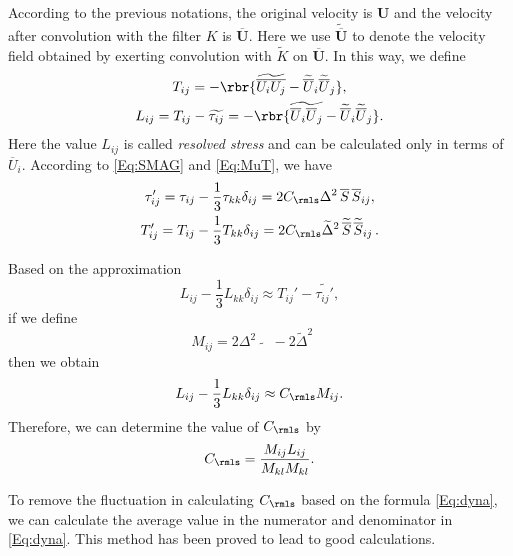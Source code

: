 \documentclass[english, nochinese]{pkupaper}
\begin{document}
According to the previous notations, the original velocity is $\mathbf{U}$ and the velocity after convolution with the filter $K$ is $\overline{\mathbf{U}}$. Here we use $\widetilde{\overline{\mathbf{U}}}$ to denote the velocity field obtained by exerting convolution with $\widetilde{K}$ on $\overline{\mathbf{U}}$. In this way, we define
\begin{gather}
T_{ij} = -\rbr{\widetilde{\overline{U_iU_j}} - \widetilde{\overline{U}}_i\widetilde{\overline{U}}_j},\\
L_{ij} = T_{ij} - \widetilde{\tau_{ij}} = - \rbr{\widetilde{\overline{U}_i\overline{U}_j} - \widetilde{\overline{U}}_i\widetilde{\overline{U}}_j}.
\end{gather}
Here the value $L_{ij}$ is called \emph{resolved stress} and can be calculated only in terms of $\overline{U}_i$. According to \eqref{Eq:SMAG} and \eqref{Eq:MuT}, we have 
\begin{gather}
\tau_{ij}' = \tau_{ij} - \frac{1}{3}\tau_{kk}\delta_{ij} = 2C_{\rmls}\Delta^2\mathop{\overline{S}}\mathop{\overline{S}_{ij}},\\
T_{ij}' = T_{ij} - \frac{1}{3}T_{kk}\delta_{ij} = 2C_{\rmls}\widetilde{\Delta}^2\mathop{\widetilde{\overline{S}}}\mathop{\widetilde{\overline{S}}_{ij}}.
\end{gather}

Based on the approximation
\begin{equation}
L_{ij} - \frac{1}{3} L_{kk}\delta_{ij}\approx T_{ij}' - \widetilde{\tau_{ij}'},
\end{equation}
if we define
\begin{equation}
M_{ij} = 2\Delta^2\widetilde{\mathop{\overline{S}}\mathop{\overline{S}_{ij}}} - 2\widetilde{\Delta}^2\mathop{\widetilde{\overline{S}}}\mathop{\widetilde{\overline{S}}_{ij}}
\end{equation}
then we obtain
\begin{equation}
L_{ij} - \frac{1}{3}L_{kk}\delta_{ij} \approx C_{\rmls} M_{ij}.
\end{equation}
Therefore, we can determine the value of $C_{\rmls}$ by
\begin{equation}\label{Eq:dyna}
C_{\rmls} = \frac{M_{ij} L_{ij}}{M_{kl}M_{kl}}.
\end{equation}

To remove the fluctuation in calculating $C_{\rmls}$ based on the formula \eqref{Eq:dyna}, we can calculate the average value in the numerator and denominator in \eqref{Eq:dyna}. This method has been proved to lead to good calculations.
\end{document}
